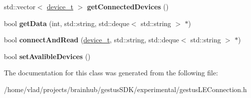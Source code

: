 \begin{DoxyCompactItemize}
std\+::vector$<$ \mbox{\hyperlink{structdevice__t}{device\+\_\+t}} $>$ {\bfseries get\+Connected\+Devices} ()
\item 
\mbox{\label{classGestusConnection_a8aa58479a29e3b3a016abb6e61117c67}} 
bool {\bfseries get\+Data} (int, std\+::string, std\+::deque$<$ std\+::string $>$ $\ast$)
\item 
\mbox{\label{classGestusConnection_acf7376b8f748afb08905b4dcf3a92504}} 
bool {\bfseries connect\+And\+Read} (\mbox{\hyperlink{structdevice__t}{device\+\_\+t}}, std\+::string, std\+::deque$<$ std\+::string $>$ $\ast$)
\item 
\mbox{\label{classGestusConnection_a33c945ff8132d2f273bef9c5d5e92626}} 
bool {\bfseries set\+Avalible\+Devices} ()
\end{DoxyCompactItemize}


The documentation for this class was generated from the following file\+:\begin{DoxyCompactItemize}
\item 
/home/vlad/projects/brainhub/gestus\+S\+D\+K/experimental/gestus\+L\+E\+Connection.\+h\end{DoxyCompactItemize}
